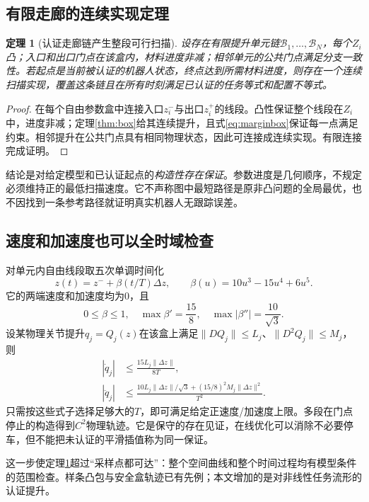 \documentclass[UTF8,11pt,a4paper,fontset=fandol]{ctexart}
\numberwithin{equation}{section}
\newtheorem{theorem}{定理}[section]
\theoremstyle{definition}
\begin{document}
\subsection{有限走廊的连续实现定理}
\begin{theorem}[认证走廊链产生整段可行扫描]\label{thm:chain}
设存在有限提升单元链$\mathcal B_1,\ldots,\mathcal B_N$，每个$Z_i$凸；入口和出口门点在该盒内，材料进度非减；相邻单元的公共门点满足分支一致性。若起点是当前被认证的机器人状态，终点达到所需材料进度，则存在一个连续扫描实现，覆盖这条链且在所有时刻满足已认证的任务等式和配置不等式。
\end{theorem}
\begin{proof}
在每个自由参数盒中连接入口$z_i^-$与出口$z_i^+$的线段。凸性保证整个线段在$Z_i$中，进度非减；定理\ref{thm:box}给其连续提升，且式\eqref{eq:marginbox}保证每一点满足约束。相邻提升在公共门点具有相同物理状态，因此可连接成连续实现。有限连接完成证明。
\end{proof}
结论是对给定模型和已认证起点的\emph{构造性存在保证}。参数进度是几何顺序，不规定必须维持正的最低扫描速度。它不声称图中最短路径是原非凸问题的全局最优，也不因找到一条参考路径就证明真实机器人无跟踪误差。

\subsection{速度和加速度也可以全时域检查}
对单元内自由线段取五次单调时间化
\begin{equation}
 z(t)=z^-+\beta(t/T)\Delta z,\qquad
 \beta(u)=10u^3-15u^4+6u^5.
 \label{eq:timepoly}
\end{equation}
它的两端速度和加速度均为0，且
\begin{equation}
0\le\beta\le1,\quad\max\beta'=\frac{15}{8},\quad
\max|\beta''|=\frac{10}{\sqrt3}.
\end{equation}
设某物理关节提升$q_j=Q_j(z)$在该盒上满足$\|DQ_j\|\le L_j$、$\|D^2Q_j\|\le M_j$，则
\begin{align}
 |\dot q_j|&\le\frac{15L_j\|\Delta z\|}{8T},\\
 |\ddot q_j|&\le\frac{10L_j\|\Delta z\|/\sqrt3+(15/8)^2M_j\|\Delta z\|^2}{T^2}.
 \label{eq:ratebounds}
\end{align}
只需按这些式子选择足够大的$T$，即可满足给定正速度/加速度上限。多段在门点停止的构造得到$C^2$物理轨迹。它是保守的存在见证，在线优化可以消除不必要停车，但不能把未认证的平滑插值称为同一保证。

这一步使定理\ref{thm:chain}超过“采样点都可达”：整个空间曲线和整个时间过程均有模型条件的范围检查。样条凸包与安全盒轨迹已有先例\cite{safebox2024,gcs2024}；本文增加的是对非线性任务流形的认证提升。
\end{document}
